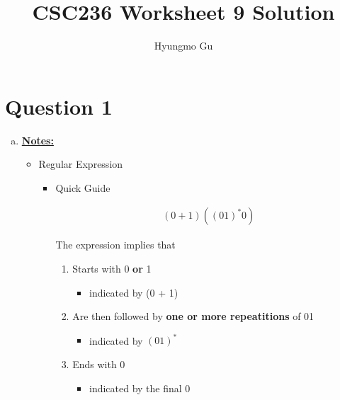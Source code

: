 \documentclass[12pt]{article}
\begin{document}
\title{CSC236 Worksheet 9 Solution}
\author{Hyungmo Gu}
\maketitle

\section*{Question 1}

\bigskip

\begin{enumerate}[a.]
    \item

    \bigskip

    \underline{\textbf{Notes:}}

    \bigskip

    \begin{itemize}
        \item Regular Expression
        \begin{itemize}
            \item Quick Guide

            \begin{align}
                (0+1)((01)^*0)
            \end{align}

            \bigskip

            The expression implies that

            \bigskip

            \begin{enumerate}[1.]
                \item Starts with 0 \textbf{or} 1
                \begin{itemize}
                    \item indicated by (0 + 1)
                \end{itemize}
                \item Are then followed by \textbf{one or more repeatitions} of 01
                \begin{itemize}
                    \item indicated by $(01)^*$
                \end{itemize}
                \item Ends with 0
                \begin{itemize}
                    \item indicated by the final 0
                \end{itemize}
            \end{enumerate}
        \end{itemize}


\end{itemize}
\end{enumerate}
\end{document}
